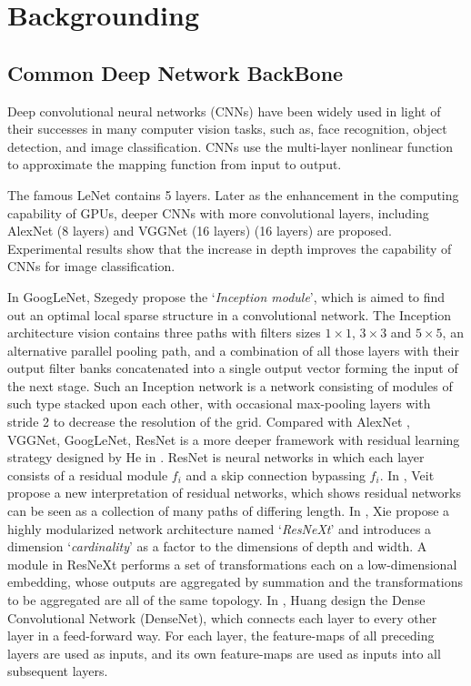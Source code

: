\section{Backgrounding}


\subsection{Common Deep Network BackBone}
Deep convolutional neural networks (CNNs) \cite{Lecun2014Backpropagation} have been widely used in light of their successes in many computer vision tasks, such as, face recognition\cite{Schroff2015FaceNet},  object detection\cite{Ren2015Faster}, and image classification\cite{Krizhevsky2012ImageNet}. CNNs use the multi-layer nonlinear function to approximate the mapping function from input to output.

The famous LeNet contains 5 layers. Later as the enhancement in the computing capability of GPUs, deeper CNNs with more convolutional layers, including AlexNet (8 layers) \cite{Krizhevsky2012ImageNet} and VGGNet (16 layers) (16 layers)\cite{Simonyan-VGG} are proposed. Experimental results show that the increase in depth improves the capability of CNNs for image classification.

In GoogLeNet\cite{Szegedy-GoogLeNet}, Szegedy \etal propose the `\emph{Inception module}', which is aimed to find out an optimal local sparse structure in a convolutional network. The Inception architecture vision contains three paths with filters sizes $1 \times 1$, $3 \times 3$ and $5\times 5$, an alternative parallel pooling path, and a combination of all those layers with their output filter banks concatenated into a single output vector forming the input of the next stage.
Such an Inception network is a network consisting of modules of such type stacked upon each other, with occasional max-pooling layers with stride 2 to decrease the resolution of the grid.
Compared with AlexNet \cite{Krizhevsky2012ImageNet}, VGGNet\cite{Simonyan-VGG}, GoogLeNet\cite{Szegedy-GoogLeNet}, ResNet is a more deeper framework with residual learning strategy designed by He \etal in \cite{He-Resnet}. ResNet is neural networks in which each layer consists of a residual module $f_i$ and a skip connection bypassing $f_i$.
In \cite{veit2016residual}, Veit \etal propose a new interpretation of residual networks, which shows residual networks can be seen as a collection of many paths of differing length.
In \cite{xie2017aggregated}, Xie \etal propose a highly modularized network architecture named `\emph{ResNeXt}' and introduces a dimension `\emph{cardinality}' as a factor to the dimensions of depth and width. A module in ResNeXt performs a set of transformations each on a low-dimensional embedding, whose outputs are aggregated by summation and the transformations to be aggregated are all of the same topology.
In \cite{huang2016densely}, Huang \etal design the Dense Convolutional Network (DenseNet), which connects each layer
to every other layer in a feed-forward way. For each layer, the feature-maps of all preceding layers are used as inputs, and its own feature-maps are used as inputs into all subsequent layers.



